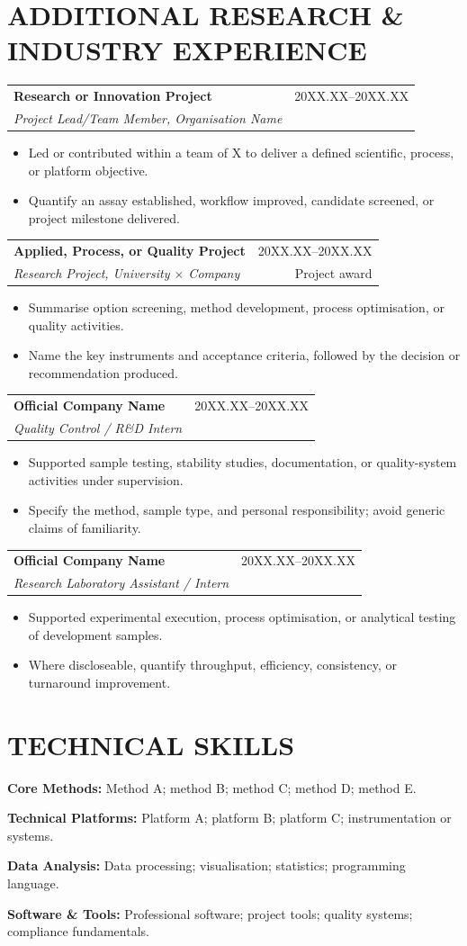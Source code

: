 \documentclass[a4paper,11pt]{article}
\makeatletter
\newcommand{\cvheading}[4]{%
  \par\addvspace{5pt}\noindent\begin{tabularx}{\linewidth}{@{}>{\raggedright\arraybackslash}Xr@{}}
    \textbf{#1} & \color{muted}\small #2 \\
    \textit{#3} & \color{muted}\small #4
  \end{tabularx}\par\vspace{-1pt}}
\newcommand{\cvheadingfirst}[4]{%
  \par\noindent\begin{tabularx}{\linewidth}{@{}>{\raggedright\arraybackslash}Xr@{}}
    \textbf{#1} & \color{muted}\small #2 \\
    \textit{#3} & \color{muted}\small #4
  \end{tabularx}\par\vspace{-1pt}}
\newenvironment{cvitems}{%
  \begin{itemize}[leftmargin=4.6mm,label=\raisebox{0.25ex}{\tiny$\bullet$},itemsep=2pt,topsep=2.2pt,parsep=0pt,partopsep=0pt]\justifying
}{\end{itemize}\vspace{1.5pt}}
\newcommand{\skillline}[2]{\justifying\textbf{#1:} #2\par\vspace{1.5pt}}
\makeatother
\begin{document}
\section{ADDITIONAL RESEARCH \& INDUSTRY EXPERIENCE}
\cvheadingfirst{Research or Innovation Project}{20XX.XX--20XX.XX}{Project Lead/Team Member, Organisation Name}{ }
\begin{cvitems}
  \item Led or contributed within a team of X to deliver a defined scientific, process, or platform objective.
  \item Quantify an assay established, workflow improved, candidate screened, or project milestone delivered.
\end{cvitems}
\cvheading{Applied, Process, or Quality Project}{20XX.XX--20XX.XX}{Research Project, University $\times$ Company}{Project award}
\begin{cvitems}
  \item Summarise option screening, method development, process optimisation, or quality activities.
  \item Name the key instruments and acceptance criteria, followed by the decision or recommendation produced.
\end{cvitems}
\cvheading{Official Company Name}{20XX.XX--20XX.XX}{Quality Control / R\&D Intern}{ }
\begin{cvitems}
  \item Supported sample testing, stability studies, documentation, or quality-system activities under supervision.
  \item Specify the method, sample type, and personal responsibility; avoid generic claims of familiarity.
\end{cvitems}
\cvheading{Official Company Name}{20XX.XX--20XX.XX}{Research Laboratory Assistant / Intern}{ }
\begin{cvitems}
  \item Supported experimental execution, process optimisation, or analytical testing of development samples.
  \item Where discloseable, quantify throughput, efficiency, consistency, or turnaround improvement.
\end{cvitems}

\section{TECHNICAL SKILLS}
\skillline{Core Methods}{Method A; method B; method C; method D; method E.}
\skillline{Technical Platforms}{Platform A; platform B; platform C; instrumentation or systems.}
\skillline{Data Analysis}{Data processing; visualisation; statistics; programming language.}
\skillline{Software \& Tools}{Professional software; project tools; quality systems; compliance fundamentals.}
\end{document}

